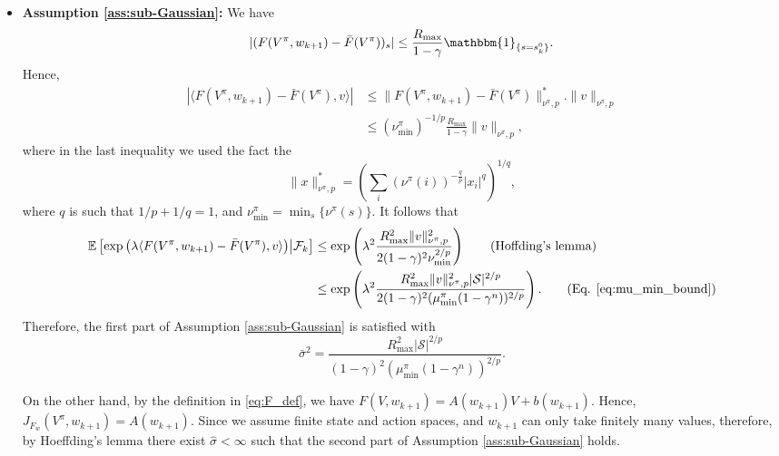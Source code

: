 \documentclass[letterpaper, 10 pt]{article}
\begin{document}
\begin{itemize}
    
    \item \textbf{Assumption \ref{ass:sub-Gaussian}:} We have
    \[
    |(F(V^\pi,w_{k+1})-\bar{F}(V^\pi))_s| \leq \frac{R_{\max}}{1-\gamma}\mathbbm{1}_{\{s=s_k^0\}}.
    \]
    Hence,
    \begin{align*}
        |\langle F(V^\pi,w_{k+1}) - \bar{F}(V^\pi), v \rangle|&\leq \|F(V^\pi,w_{k+1}) - \bar{F}(V^\pi)\|_{\nu^\pi,p}^*.\|v\|_{\nu^\pi,p}\tag{H\"older's inequality}\\
        &\leq (\nu^\pi_{\min})^{-1/p}\frac{R_{\max}}{1-\gamma}\|v\|_{\nu^\pi,p},
    \end{align*}
    where in the last inequality we used the fact the
    \[ \|x\|_{\nu^\pi,p}^*=\left(\sum_{i}(\nu^\pi (i))^{-\frac{q}{p}}|x_i|^q\right)^{1/q}, \]
    where $q$ is such that $1/p+1/q=1$, and $\nu^\pi_{\min}=\min_s\{\nu^\pi(s)\}$. 
    It follows that
    \begin{align*}
        \mathbb{E} \left[\exp\left(\lambda \langle F(V^\pi,w_{k+1}) - \bar{F}(V^\pi), v \rangle \right) \middle| \mathcal{F}_k \right]  &\leq \exp\left(\lambda^2\frac{R_{\max}^2\|v\|_{\nu^\pi,p}^2}{2(1-\gamma)^2\nu_{\min}^{2/p}} \right)\tag{Hoffding's lemma}\\
        &\leq \exp\left(\lambda^2\frac{R_{\max}^2\|v\|_{\nu^\pi,p}^2|\mathcal{S}|^{2/p}}{2(1-\gamma)^2(\mu_{\min}^\pi(1-\gamma^n))^{2/p}}\right).\tag{Eq. \eqref{eq:mu_min_bound}}
    \end{align*}
    Therefore, the first part of Assumption \ref{ass:sub-Gaussian} is satisfied with
    \[ \bar{\sigma}^2=\frac{R_{\max}^2|\mathcal{S}|^{2/p}}{(1-\gamma)^2 (\mu_{\min}^\pi (1-\gamma^n))^{2/p}}. \]

    On the other hand, by the definition in \eqref{eq:F_def}, we have $F(V,w_{k+1})=A(w_{k+1})V+b(w_{k+1})$. Hence, $J_{F_w}(V^\pi,w_{k+1})=A(w_{k+1})$. Since we assume finite state and action spaces, and $w_{k+1}$ can only take finitely many values, therefore, by Hoeffding's lemma there exist $\hat{\sigma}<\infty$ such that the second part of Assumption \ref{ass:sub-Gaussian} holds.
\end{itemize}
\end{document}
